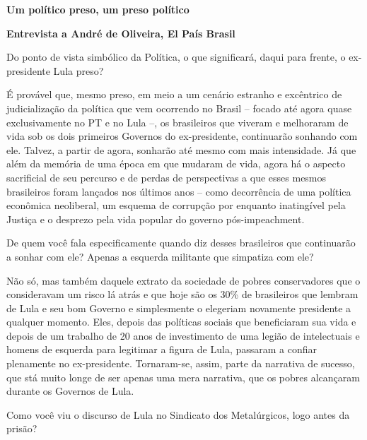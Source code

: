 \textbf{Um político preso, um preso político}

\textbf{Entrevista a André de Oliveira, El País Brasil}

Do ponto de vista simbólico da Política, o que significará, daqui para
frente, o ex-presidente Lula preso?

É provável que, mesmo preso, em meio a um cenário estranho e excêntrico
de judicialização da política que vem ocorrendo no Brasil -- focado até
agora quase exclusivamente no PT e no Lula --, os brasileiros que
viveram e melhoraram de vida sob os dois primeiros Governos do
ex-presidente, continuarão sonhando com ele. Talvez, a partir de agora,
sonharão até mesmo com mais intensidade. Já que além da memória de uma
época em que mudaram de vida, agora há o aspecto sacrificial de seu
percurso e de perdas de perspectivas a que esses mesmos brasileiros
foram lançados nos últimos anos -- como decorrência de uma política
econômica neoliberal, um esquema de corrupção por enquanto inatingível
pela Justiça e o desprezo pela vida popular do governo pós-impeachment.

De quem você fala especificamente quando diz desses brasileiros que
continuarão a sonhar com ele? Apenas a esquerda militante que simpatiza
com ele?

Não só, mas também daquele extrato da sociedade de pobres conservadores
que o consideravam um risco lá atrás e que hoje são os 30\% de
brasileiros que lembram de Lula e seu bom Governo e simplesmente o
elegeriam novamente presidente a qualquer momento. Eles, depois das
políticas sociais que beneficiaram sua vida e depois de um trabalho de
20 anos de investimento de uma legião de intelectuais e homens de
esquerda para legitimar a figura de Lula, passaram a confiar plenamente
no ex-presidente. Tornaram-se, assim, parte da narrativa de sucesso, que
stá muito longe de ser apenas uma mera narrativa, que os pobres
alcançaram durante os Governos de Lula.

Como você viu o discurso de Lula no Sindicato dos Metalúrgicos, logo
antes da prisão?

